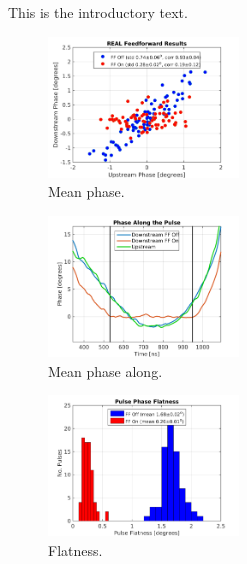 
This is the introductory text.



\begin{figure}
  \centering
  \includegraphics[width=0.45\textwidth]{Figures/BestFF_Real}
  \caption{Mean phase.}
  \label{f:BestFF_Real}
\end{figure}

\begin{figure}
  \centering
  \includegraphics[width=0.45\textwidth]{Figures/BestFF_MeanPhaseAlong}
  \caption{Mean phase along.}
  \label{f:BestFF_MeanPhaseAlong}
\end{figure}

\begin{figure}
  \centering
  \includegraphics[width=0.45\textwidth]{Figures/BestFF_Flatness}
  \caption{Flatness.}
  \label{f:BestFF_Flatness}
\end{figure}


